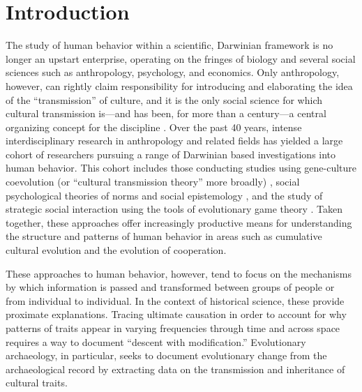 
\section{Introduction}
\label{sec:introduction}
The study of human behavior within a scientific, Darwinian framework is no longer an upstart enterprise, operating on the fringes of biology and several social sciences such as anthropology, psychology, and economics. Only anthropology, however, can rightly claim responsibility for introducing and elaborating the idea of the “transmission” of culture, and it is the only social science for which cultural transmission is—and has been, for more than a century—a central organizing concept for the discipline \citep{lyman2008cultural}. Over the past 40 years, intense interdisciplinary research in anthropology and related fields has yielded a large cohort of researchers pursuing a range of Darwinian based investigations into human behavior. This cohort includes those conducting studies using gene-culture coevolution (or “cultural transmission theory” more broadly) , social psychological theories of norms and social epistemology , and the study of strategic social interaction using the tools of evolutionary game theory . Taken together, these approaches offer increasingly productive means for understanding the structure and patterns of human behavior in areas such as cumulative cultural evolution and the evolution of cooperation. 

These approaches to human behavior, however, tend to focus on the mechanisms by which information is passed and transformed between groups of people or from individual to individual.  In the context of historical science, these provide proximate explanations.   Tracing ultimate causation in order to account for why patterns of traits appear in varying frequencies through time and across space requires a way to document ``descent with modification.''  Evolutionary archaeology, in particular, seeks to document evolutionary change from the archaeological record by extracting data on the transmission and inheritance of cultural traits.  

